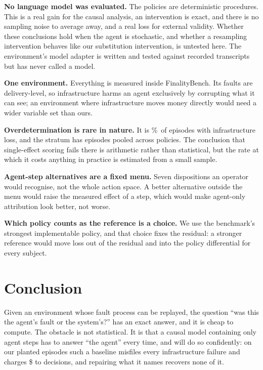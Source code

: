 \documentclass[conference]{IEEEtran}
\begin{document}
\textbf{No language model was evaluated.} The policies are deterministic
procedures. This is a real gain for the causal analysis, an intervention is
exact, and there is no sampling noise to average away, and a real loss for
external validity. Whether these conclusions hold when the agent is
stochastic, and whether a resampling intervention behaves like our substitution
intervention, is untested here. The environment's model adapter is written and
tested against recorded transcripts but has never called a model.

\textbf{One environment.} Everything is measured inside FinalityBench. Its
faults are delivery-level, so infrastructure harms an agent exclusively by
corrupting what it can see; an environment where infrastructure moves money
directly would need a wider variable set than ours.

\textbf{Overdetermination is rare in nature.} It is \overdetRate\%\ of episodes
with infrastructure loss, and the stratum has \nOverdetermined{} episodes pooled
across \nPolicies{} policies. The conclusion that single-effect scoring fails
there is arithmetic rather than statistical, but the rate at which it costs
anything in practice is estimated from a small sample.

\textbf{Agent-step alternatives are a fixed menu.} Seven dispositions an
operator would recognise, not the whole action space. A better alternative
outside the menu would raise the measured effect of a step, which would make
agent-only attribution look better, not worse.

\textbf{Which policy counts as the reference is a choice.} We use the
benchmark's strongest implementable policy, and that choice fixes the
residual: a stronger reference would move loss out of the residual and into
the policy differential for every subject.

\section{Conclusion}

Given an environment whose fault process can be replayed, the question ``was
this the agent's fault or the system's?'' has an exact answer, and it is cheap
to compute. The obstacle is not statistical. It is that a causal model
containing only agent steps has to answer ``the agent'' every time, and will
do so confidently: on our planted episodes such a baseline misfiles every
infrastructure failure and charges \$\agentOnlyDollars{} to decisions, and
repairing what it names recovers none of it.
\end{document}
